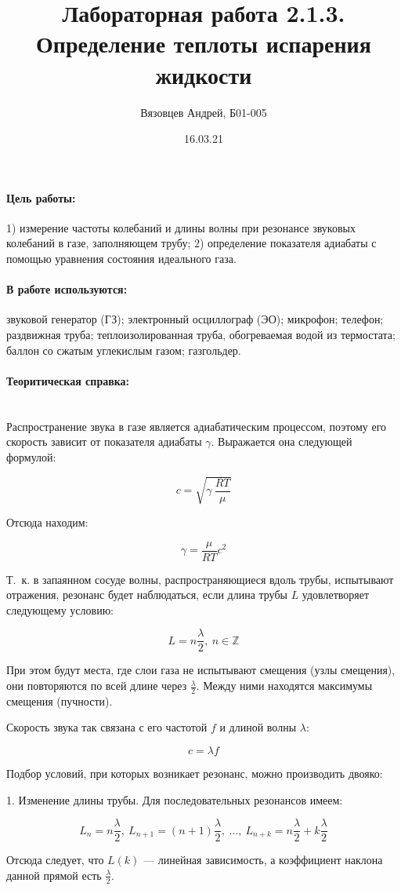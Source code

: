 \documentclass[a4paper, 12pt]{article}
\author{Вязовцев Андрей, Б01-005}
\date{16.03.21}
\title{Лабораторная работа 2.1.3. Определение теплоты испарения жидкости}
\newcommand{\parag}[1]{\paragraph*{#1:}}
\begin{document}
\maketitle

\parag {Цель работы}
1) измерение частоты колебаний и длины волны при резонансе звуковых колебаний в газе, заполняющем трубу; 2) определение показателя адиабаты с помощью уравнения состояния идеального газа.

\parag {В работе используются}
звуковой генератор (ГЗ); электронный осциллограф (ЭО); микрофон; телефон; раздвижная труба; теплоизолированная труба, обогреваемая водой из термостата; баллон со сжатым углекислым газом; газгольдер.

\parag {Теоритическая справка} ~\\

Распространение звука в газе является адиабатическим процессом, поэтому его скорость зависит от показателя адиабаты $\gamma$. Выражается она следующей формулой:

\[
    c = \sqrt{\gamma ~\frac{RT}{\mu}}
\]

Отсюда находим:

\[
    \gamma = \frac{\mu}{RT}c^2
\]

Т.~к. в запаянном сосуде волны, распространяющиеся вдоль трубы, испытывают отражения, резонанс будет наблюдаться, если длина трубы $L$ удовлетворяет следующему условию:

\[
    L = n \frac{\lambda}{2},~n \in \mathbb{Z} 
\]

При этом будут места, где слои газа не испытывают смещения (узлы смещения), они повторяются по всей длине через $\displaystyle \frac{\lambda}{2}$. Между ними находятся максимумы смещения (пучности).

Скорость звука так связана с его частотой $f$ и длиной волны $\lambda$:

\begin{equation} \label{eq:main}
    c = \lambda f
\end{equation}

Подбор условий, при которых возникает резонанс, можно производить двояко:

1. Изменение длины трубы. Для последовательных резонансов имеем:

\[
    L_n = n \frac{\lambda}{2},~L_{n+1} = (n+1) \frac{\lambda}{2}, ~\dots, ~ L_{n+k} = n\frac{\lambda}{2} + k \frac{\lambda}{2}
\]

Отсюда следует, что $L (k)$ --- линейная зависимость, а коэффициент наклона данной прямой есть $\displaystyle \frac{\lambda}{2}$.
\end{document}

